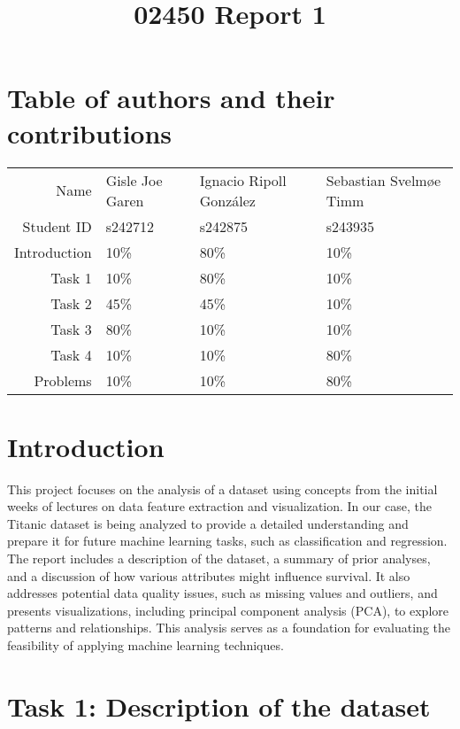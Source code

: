 \documentclass[twoside,11pt]{article}
\title{02450 Report 1}
\makeatletter
\let\@oldsection\section
\renewcommand\section[1]{\@oldsection*{#1}}
\makeatother
\begin{document}
\maketitle\vspace{-3em}

\section{Table of authors and their contributions}

\begin{center}
	\begin{tabular}{| r | l | l | l |}
		\hline
				Name & Gisle Joe Garen & Ignacio Ripoll González & Sebastian Svelmøe Timm\\
		Student ID   & s242712 & s242875 & s243935\\
		\hline
		Introduction & 10\% & 80\% & 10\%\\
			  Task 1 & 10\% & 80\% & 10\%\\
			  Task 2 & 45\% & 45\% & 10\%\\
			  Task 3 & 80\% & 10\% & 10\%\\
			  Task 4 & 10\% & 10\% & 80\%\\
			Problems & 10\% & 10\% & 80\%\\
		\hline
	\end{tabular}
\end{center}


\section{Introduction}

This project focuses on the analysis of a dataset using concepts from the initial weeks of lectures on data feature extraction and visualization. In our case, the Titanic dataset is being analyzed to provide a detailed understanding and prepare it for future machine learning tasks, such as classification and regression. The report includes a description of the dataset, a summary of prior analyses, and a discussion of how various attributes might influence survival. It also addresses potential data quality issues, such as missing values and outliers, and presents visualizations, including principal component analysis (PCA), to explore patterns and relationships. This analysis serves as a foundation for evaluating the feasibility of applying machine learning techniques.


\section{Task 1: Description of the dataset}
\end{document}
